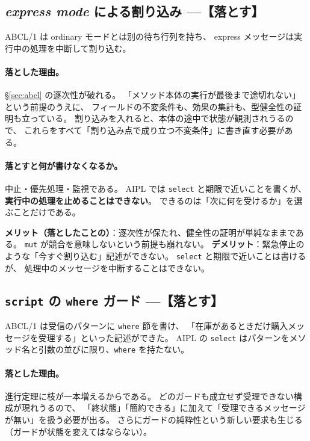 \documentclass[11pt,a4paper]{ltjsarticle}
\theoremstyle{definition}
\theoremstyle{remark}
\begin{document}
\subsection{\textit{express mode} による割り込み ---【落とす】}


ABCL/1 は ordinary モードとは別の待ち行列を持ち、
express メッセージは実行中の処理を中断して割り込む。

\paragraph{落とした理由。}
\S\ref{sec:abcl} の逐次性が破れる。
「メソッド本体の実行が最後まで途切れない」という前提のうえに、
フィールドの不変条件も、効果の集計も、型健全性の証明も立っている。
割り込みを入れると、本体の途中で状態が観測されうるので、
これらをすべて「割り込み点で成り立つ不変条件」に書き直す必要がある。

\paragraph{落とすと何が書けなくなるか。}
中止・優先処理・監視である。
AIPL では \texttt{select} と期限で近いことを書くが、
\textbf{実行中の処理を止めることはできない}。
できるのは「次に何を受けるか」を選ぶことだけである。

\textbf{メリット（落としたことの）}：逐次性が保たれ、健全性の証明が単純なままである。
\texttt{mut} が競合を意味しないという前提も崩れない。
\textbf{デメリット}：緊急停止のような「今すぐ割り込む」記述ができない。
\texttt{select} と期限で近いことは書けるが、
処理中のメッセージを中断することはできない。

\subsection{\texttt{script} の \texttt{where} ガード ---【落とす】}


ABCL/1 は受信のパターンに \texttt{where} 節を書け、
「在庫があるときだけ購入メッセージを受理する」といった記述ができた。
AIPL の \texttt{select} はパターンをメソッド名と引数の並びに限り、\texttt{where} を持たない。

\paragraph{落とした理由。}
進行定理に枝が一本増えるからである。
どのガードも成立せず受理できない構成が現れうるので、
「終状態」「簡約できる」に加えて「受理できるメッセージが無い」を扱う必要が出る。
さらにガードの純粋性という新しい要求も生じる（ガードが状態を変えてはならない）。
\end{document}
